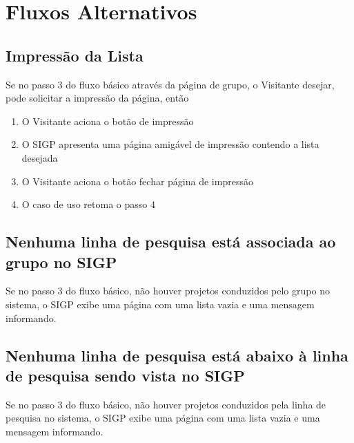 \documentclass[11pt, a4paper,oneside]{book}
\begin{document}
\section{Fluxos Alternativos}

\subsection{Impressão da Lista}
Se no passo $3$ do fluxo básico através da página de grupo, o Visitante desejar, pode solicitar a impressão da página, então

\begin{enumerate}
\item O Visitante aciona o botão de impressão
\item O SIGP apresenta uma página amigável de impressão contendo a lista desejada
\item O Visitante aciona o botão fechar página de impressão
\item O caso de uso retoma o passo 4
\end{enumerate}

\subsection{Nenhuma linha de pesquisa está associada ao grupo no SIGP}
Se no passo $3$ do fluxo básico, não houver projetos conduzidos pelo grupo no sistema, o SIGP exibe uma página com uma lista vazia e uma mensagem informando.

\subsection{Nenhuma linha de pesquisa está abaixo à linha de pesquisa sendo vista no SIGP}
Se no passo $3$ do fluxo básico, não houver projetos conduzidos pela linha de pesquisa no sistema, o SIGP exibe uma página com uma lista vazia e uma mensagem informando.
\end{document}
